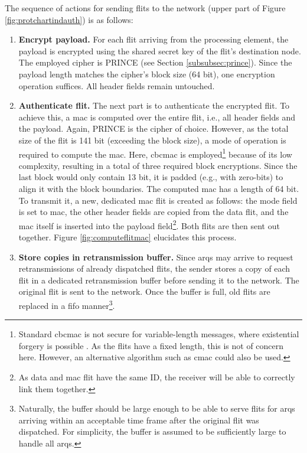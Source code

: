 The sequence of actions for sending flits to the network (upper part of Figure \ref{fig:protchartindauth}) is as follows:
\begin{enumerate}
    \item \textbf{Encrypt payload.} For each flit arriving from the processing element, the payload is encrypted using the shared secret key of the
        flit's destination node. The employed cipher is PRINCE (see Section \ref{subsubsec:prince}). Since the payload length matches the cipher's
        block size (64 bit), one encryption operation suffices. All header fields remain untouched.
    \item \textbf{Authenticate flit.} The next part is to authenticate the encrypted flit. To achieve this, a \gls{mac} is computed over the entire
        flit, i.e., all header fields and the payload. Again, PRINCE is the cipher of choice. However, as the total size of the flit is 141 bit
        (exceeding the block size), a mode of operation is required to compute the \gls{mac}. Here, \gls{cbcmac} is employed\footnote{Standard
        \gls{cbcmac} is not secure for variable-length messages, where existential forgery is possible \cite{wikilengthextattack}. As the flits have a
        fixed length, this is not of concern here. However, an alternative algorithm such as \gls{cmac} could also be used.} because of its low
        complexity, resulting in a total of three required block encryptions. Since the last block would only contain 13 bit, it is
        padded (e.g., with zero-bits) to align it with the block boundaries. The computed \gls{mac} has a length of 64 bit. To transmit it, a new, dedicated
        \gls{mac} flit is created as follows: the mode field is set to \gls{mac}, the other header fields are copied from the data flit, and the
        \gls{mac} itself is inserted into the payload field\footnote{As data and \gls{mac} flit have the same ID, the receiver will be able to
        correctly link them together.}. Both flits are then sent out together. Figure \vref{fig:computeflitmac} elucidates this process.
    \item \textbf{Store copies in retransmission buffer.} Since \glspl{arq} may arrive to request retransmissions of already dispatched flits, the
        sender stores a copy of each flit in a dedicated retransmission buffer before sending it to the network. The original flit is sent to the
        network. Once the buffer is full, old flits are replaced in a \gls{fifo} manner\footnote{Naturally, the buffer should be large enough to be
        able to serve flits for \glspl{arq} arriving within an acceptable time frame after the original flit was dispatched. For simplicity, the
        buffer is assumed to be sufficiently large to handle all \glspl{arq}.}.
\end{enumerate}
\vspace{0.5\baselineskip}

